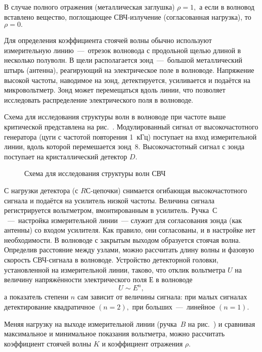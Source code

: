 В случае полного отражения (металлическая заглушка) $\rho=1,$ а если в волновод
вставлено вещество, поглощающее СВЧ-­излучение (согласованная нагрузка), то
$\rho=0.$

Для определения коэффициента стоячей волны обычно используют измерительную
линию~---~отрезок волновода с продольной щелью длиной в несколько полуволн. В
щели располагается зонд~---~большой металлический штырь (антенна), реагирующий
на электрическое поле в волноводе. Напряжение высокой частоты, наводимое на
зонд, детектируется, усиливается и подаётся на микровольтметр. Зонд может
перемещаться вдоль линии, что позволяет исследовать распределение электрического
поля в волноводе.


\experiment Схема для исследования структуры волн в волноводе при частоте выше
критической представлена на рис.~. Модулированный
сигнал от высокочастотного генератора (цуги с частотой повторения 1~кГц)
поступает на вход измерительной линии, вдоль которой перемешается зонд~8.
Высокочастотный сигнал с зонда поступает на кристаллический детектор $D$.

\begin{figure}[h!]
    \caption{Схема для исследования структуры волн СВЧ} 
\end{figure}

С нагрузки детектора (с $RС$-цепочки) снимается огибающая высокочастотного
сигнала и подаётся на усилитель низкой частоты. Величина сигнала регистрируется
вольтметром, вмонтированным в усилитель. Ручка~$С$~---~настройка измерительной
линии~--- служит для согласования зонда (как антенны) со входом усилителя. Как
правило, они согласованы, и в настройке нет необходимости. В волноводе с
закрытым выходом образуется стоячая волна. Определив расстояние между узлами,
можно рассчитать длину волны и фазовую скорость СВЧ-сигнала в волноводе.
Устройство детекторной головки, установленной на измерительной линии, таково,
что отклик вольтметра $U$ на величину напряжённости электрического поля $Е$ в
волноводе \begin{equation*} U\sim E^{n}, \end{equation*} а показатель степени
$n$ сам зависит от величины сигнала: при малых сигналах детектирование
квадратичное $(n=2),$ при больших~---~линейное $(n=1).$

Меняя нагрузку на выходе измерительной линии (ручка~$B$ на рис.~) и сравнивая максимальное и минимальное показания вольтметра, можно
рассчитать коэффициент стоячей волны $K$ и коэффициент отражения $\rho.$

